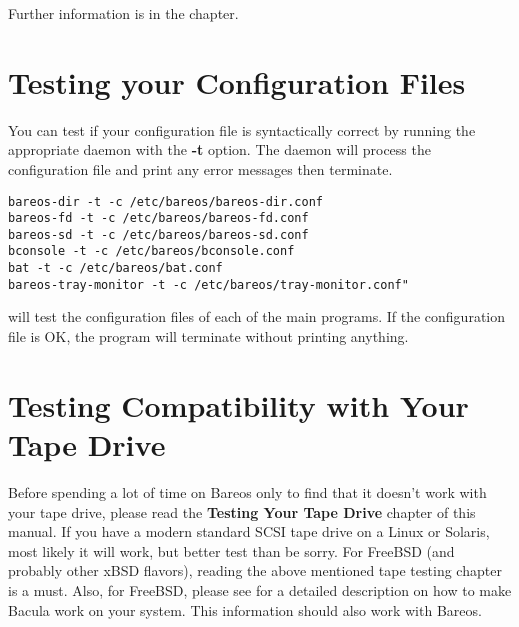 Further information is in the
 chapter.

\section{Testing your Configuration Files}

You can test if your configuration file is syntactically correct by running
the appropriate daemon with the {\bf -t} option. The daemon will process the
configuration file and print any error messages then terminate.

\footnotesize
\begin{verbatim}
bareos-dir -t -c /etc/bareos/bareos-dir.conf
bareos-fd -t -c /etc/bareos/bareos-fd.conf
bareos-sd -t -c /etc/bareos/bareos-sd.conf
bconsole -t -c /etc/bareos/bconsole.conf
bat -t -c /etc/bareos/bat.conf
bareos-tray-monitor -t -c /etc/bareos/tray-monitor.conf"
\end{verbatim}
\normalsize

will test the configuration files of each of the main programs. If the
configuration file is OK, the program will terminate without printing
anything.
\label{TapeTesting}

\section{Testing Compatibility with Your Tape Drive}

Before spending a lot of time on Bareos only to find that it doesn't work
with your tape drive, please read the {\bf Testing Your Tape
Drive} chapter of this manual.
If you have a modern
standard SCSI tape drive on a Linux or Solaris, most likely it will work,
but better test than be sorry.  For FreeBSD (and probably other xBSD
flavors), reading the above mentioned tape testing chapter is a must.
Also, for FreeBSD, please see  for a detailed description
on how to make Bacula work on your system. 
This information should also work with Bareos. 



